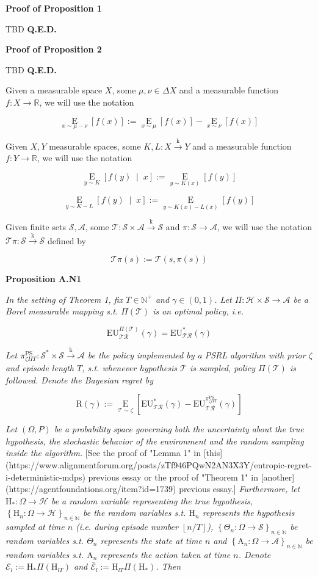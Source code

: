 \documentclass[a4paper]{article}
\newcommand{\Co}[1]{}
\newcommand{\AP}[1]{\left(#1\right)}
\newcommand{\AB}[1]{\left[#1\right]}
\newcommand{\AC}[1]{\left\{#1\right\}}
\newcommand{\ABM}[2]{\left[#1\;\middle\vert\;#2\right]}
\newcommand{\Ea}[2]{\underset{#1}{\operatorname{E}}\AB{#2}}
\newcommand{\CE}[3]{\underset{#1}{\operatorname{E}}\ABM{#2}{#3}}
\newcommand{\Nats}{\mathbb{N}}
\newcommand{\Reals}{\mathbb{R}}
\newcommand{\Floor}[1]{\left\lfloor #1 \right\rfloor}
\newcommand{\K}{\xrightarrow{\mathrm{k}}}
\newcommand{\St}{\mathcal{S}}
\newcommand{\A}{\mathcal{A}}
\newcommand{\R}{\mathcal{R}}
\newcommand{\T}{\mathcal{T}}
\newcommand{\Hy}{\mathcal{H}}
\newcommand{\EU}{\mathrm{EU}}
\newcommand{\Reg}{\mathrm{R}}
\newcommand{\PSR}{\text{PS}}
\newcommand{\AT}{\mathrm{A}}
\newcommand{\THy}{\mathrm{H}_*}
\newcommand{\SHy}{\mathrm{H}}
\newcommand{\Ev}{\mathcal{E}}
\begin{document}
\textbf{Proof of Proposition 1}\Co{b}

TBD \textbf{Q.E.D.}\Co{b}

\textbf{Proof of Proposition 2}\Co{b}

TBD \textbf{Q.E.D.}\Co{b}

Given a measurable space $X$, some $\mu,\nu\in\Delta X$ and a measurable function $f:X\rightarrow\Reals$, we will use the notation

$$\Ea{x\sim\mu-\nu}{f(x)}:=\Ea{x\sim\mu}{f(x)}-\Ea{x\sim\nu}{f(x)}$$

Given $X,Y$ measurable spaces, some $K,L:X\K Y$ and a measurable function $f:Y\rightarrow\Reals$, we will use the notation

$$\CE{y\sim K}{f(y)}{x}:=\Ea{y\sim K(x)}{f(y)}$$

$$\CE{y\sim K-L}{f(y)}{x}:=\Ea{y\sim K(x)-L(x)}{f(y)}$$

Given finite sets $\St,\A$, some $\T:\St\times\A\K\St$ and $\pi:\St\rightarrow\A$, we will use the notation $\T\pi:\St\K\St$ defined by

$$\T\pi(s):=\T\AP{s,\pi(s)}$$

\textbf{Proposition A.N1}\Co{b}

\textit{In the setting of Theorem 1, fix $T\in\Nats^+$ and $\gamma\in(0,1)$. Let $\Pi:\Hy\times\St\rightarrow\A$ be a Borel measurable mapping s.t. $\Pi(\T)$ is an optimal policy, i.e.}\Co{i}

$$\EU^{\Pi(\T)}_{\T\R}(\gamma)=\EU^{*}_{\T\R}(\gamma)$$

\textit{Let $\pi_{\zeta\Pi T}^{\PSR}: \St^*\times\St\K\A$ be the policy implemented by a PSRL algorithm with prior $\zeta$ and episode length $T$, s.t. whenever hypothesis $\T$ is sampled, policy $\Pi(\T)$ is followed. Denote the Bayesian regret by}\Co{i}

$$\Reg(\gamma):=\Ea{\T\sim\zeta}{\EU^*_{\T\R}(\gamma)-\EU^{\pi_{\zeta\Pi T}^{\PSR}}_{\T\R}(\gamma)}$$

\textit{Let $(\Omega,P)$ be a probability space governing both the uncertainty about the true hypothesis, the stochastic behavior of the environment and the random sampling inside the algorithm.}\Co{i} [See the proof of "Lemma 1" in [this](https://www.alignmentforum.org/posts/zTf946PQwN2AN3X3Y/entropic-regret-i-deterministic-mdps) previous essay or the proof of "Theorem 1" in [another](https://agentfoundations.org/item?id=1739) previous essay.]\textit{ Furthermore, let $\THy:\Omega\rightarrow\Hy$ be a random variable representing the true hypothesis, $\AC{\SHy_n:\Omega\rightarrow\Hy}_{n\in\Nats}$ be the random variables s.t. $\SHy_n$ represents the hypothesis sampled at time $n$ (i.e. during episode number $\Floor{n/T}$), $\AC{\Theta_n:\Omega\rightarrow\St}_{n\in\Nats}$ be random variables s.t. $\Theta_n$ represents the state at time $n$ and $\AC{\AT_n:\Omega\rightarrow\A}_{n\in\Nats}$ be random variables s.t. $\AT_n$ represents the action taken at time $n$. Denote $\Ev_l:=\SHy_*\Pi\AP{\SHy_{lT}}$ and $\bar{\Ev}_l:=\SHy_{lT}\Pi\AP{\SHy_*}$. Then}\Co{i}
\end{document}
